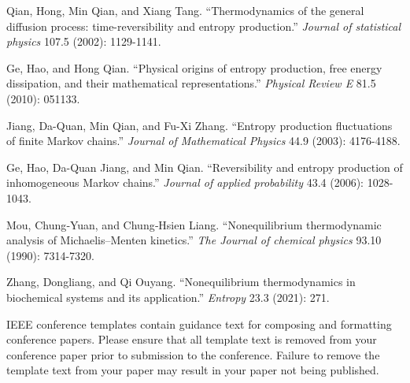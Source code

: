 \documentclass[conference]{IEEEtran}
\begin{document}
\begin{thebibliography}{100}
 Qian, Hong, Min Qian, and Xiang Tang. ``Thermodynamics of the general diffusion process: time-reversibility and entropy production.'' {\it Journal of statistical physics} 107.5 (2002): 1129-1141.

 Ge, Hao, and Hong Qian. ``Physical origins of entropy production, free energy dissipation, and their mathematical representations.'' {\it Physical Review E} 81.5 (2010): 051133.

 Jiang, Da-Quan, Min Qian, and Fu-Xi Zhang. ``Entropy production fluctuations of finite Markov chains.'' {\it Journal of Mathematical Physics} 44.9 (2003): 4176-4188.

 Ge, Hao, Da-Quan Jiang, and Min Qian. ``Reversibility and entropy production of inhomogeneous Markov chains.'' {\it Journal of applied probability} 43.4 (2006): 1028-1043.

 Mou, Chung‐Yuan, and Chung‐Hsien Liang. ``Nonequilibrium thermodynamic analysis of Michaelis–Menten kinetics.'' {\it The Journal of chemical physics} 93.10 (1990): 7314-7320.

 Zhang, Dongliang, and Qi Ouyang. ``Nonequilibrium thermodynamics in biochemical systems and its application.'' {\it Entropy} 23.3 (2021): 271.

\end{thebibliography}

\vspace{12pt}

IEEE conference templates contain guidance text for composing and formatting conference papers. Please ensure that all template text is removed from your conference paper prior to submission to the conference. Failure to remove the template text from your paper may result in your paper not being published.
\end{document}
